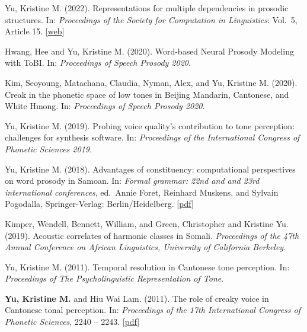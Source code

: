 \documentclass[10pt]{article}
\begin{document}
\begin{bibenum}

\item Yu, Kristine M. (2022). Representations for multiple dependencies in prosodic structures. In: \emph{Proceedings of the Society for Computation in Linguistics}: Vol.~5, Article 15.  [\href{https://doi.org/10.7275/hj4r-d776}{web}]
  
\item Hwang, Hee and Yu, Kristine M. (2020). Word-based Neural Prosody Modeling with ToBI. In: \emph{Proceedings of Speech Prosody 2020}.

\item Kim, Seoyoung, Matachana, Claudia, Nyman, Alex, and Yu, Kristine M. (2020). Creak in the phonetic space of low tones in Beijing Mandarin, Cantonese, and
White Hmong. In: \emph{Proceedings of Speech Prosody 2020}.
  
\item Yu, Kristine M. (2019). Probing voice quality's contribution to tone perception: challenges for synthesis software. In: \emph{Proceedings of the International Congress of Phonetic Sciences 2019}. 
  
\item Yu, Kristine M. (2018). Advantages of constituency: computational perspectives on word prosody in Samoan. In: \emph{Formal grammar: 22nd and and 23rd international conferences}, ed.\ Annie Foret, Reinhard Muskens, and Sylvain Pogodalla, Springer-Verlag: Berlin/Heidelberg. [\href{https://github.com/krismyu/smo-constituency-feet/blob/master/fg-kmyu.pdf}{pdf}]

  \item Kimper, Wendell, Bennett, William, and Green, Christopher and Kristine Yu. (2019). Acoustic correlates of harmonic classes in
    Somali. \emph{Proceedings of the 47th Annual Conference on African Linguistics, University of California Berkeley}.
  
    \item Yu, Kristine M. (2011). Temporal resolution in {C}antonese tone
      perception. In: \emph{Proceedings of The Psycholinguistic Representation of Tone}.

    \item \textbf{Yu, Kristine M.} and Hiu Wai Lam. (2011). The role of creaky
      voice in {C}antonese tonal perception. In: \emph{Proceedings of the
        17th International Congress of Phonetic Sciences},
      2240 -- 2243. [\href{http://www.krisyu.org/pages/pdfs/yu-lam2011-icphs-cantonese-creak.pdf}{pdf}] 


\end{bibenum}
\end{document}
